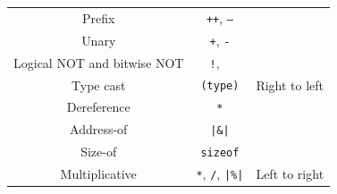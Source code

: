 \documentclass{report}
\begin{document}
\begin{table}[H]
\begin{tabular}{c c c}
        \midrule
        Prefix                        & \texttt{++}, \texttt{--}                                                                                                                                                                                    & \multirow{7}{*}{Right to left} \\
        Unary                         & \texttt{+}, \texttt{-}                                                                                                                                                                                      &                                \\
        Logical NOT and bitwise NOT   & \texttt{!}, \texttt{~}                                                                                                                                                                                      &                                \\
        Type cast                     & \texttt{(type)}                                                                                                                                                                                                    &                                \\
        Dereference                   & \texttt{*}                                                                                                                                                                                                         &                                \\
        Address-of                    & \texttt{|\&|}                                                                                                                                                                                     &                                \\
        Size-of                       & \texttt{sizeof}                                                                                                                                                                                                    &                                \\
        \midrule
        Multiplicative                & \texttt{*}, \texttt{/}, \texttt{|\%|}                                                                                                                                               & Left to right                  \\

\end{tabular}
\end{table}
\end{document}
